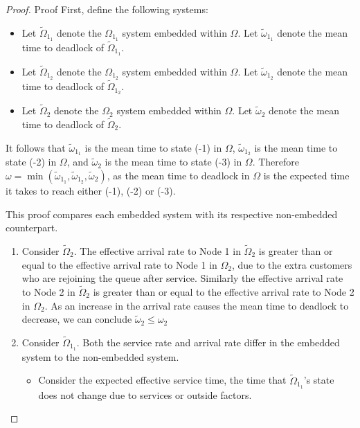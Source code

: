 \documentclass{article}
\numberwithin{equation}{section}
\begin{document}
\begin{proof}{Proof}
First, define the following systems:
\begin{itemize}
  \item Let $\widetilde{\Omega}_{1_1}$ denote the $\Omega_{1_1}$ system
  embedded within $\Omega$. Let $\widetilde{\omega}_{1_1}$ denote the mean
  time to deadlock of $\widetilde{\Omega}_{1_1}$.
  \item Let $\widetilde{\Omega}_{1_2}$ denote the $\Omega_{1_2}$ system
  embedded within $\Omega$. Let $\widetilde{\omega}_{1_2}$ denote the mean
  time to deadlock of $\widetilde{\Omega}_{1_2}$.
  \item Let $\widetilde{\Omega}_2$ denote the $\Omega_2$ system embedded
  within $\Omega$. Let $\widetilde{\omega}_2$ denote the mean time to deadlock
  of $\widetilde{\Omega}_2$.
\end{itemize}

It follows that $\widetilde{\omega}_{1_1}$ is the mean time to state (-1) in
$\Omega$, $\widetilde{\omega}_{1_2}$ is the mean time to state (-2) in
$\Omega$, and $\widetilde{\omega}_2$ is the mean time to state (-3) in
$\Omega$.
Therefore $\omega = \min(\widetilde{\omega}_{1_1}, \widetilde{\omega}_{1_2},
\widetilde{\omega}_2)$, as the mean time to deadlock in $\Omega$ is the
expected time it takes to reach either (-1), (-2) or (-3).

This proof compares each embedded system with its respective non-embedded
counterpart.

\begin{enumerate}

\item Consider $\widetilde{\Omega}_2$.
The effective arrival rate to Node 1 in $\widetilde{\Omega}_2$ is greater than
or equal to the effective arrival rate to Node 1 in $\Omega_2$, due to the
extra customers who are rejoining the queue after service.
Similarly the effective arrival rate to Node 2 in $\widetilde{\Omega}_2$ is
greater than or equal to the effective arrival rate to Node 2 in $\Omega_2$.
As an increase in the arrival rate causes the mean time to deadlock to
decrease, we can conclude $\widetilde{\omega}_2 \leq \omega_2$

\item Consider $\widetilde{\Omega}_{1_1}$. Both the service rate and arrival
rate differ in the embedded system to the non-embedded system.

\begin{itemize}

\item Consider the expected effective service time, the time that
$\widetilde{\Omega}_{1_1}$'s state does not change due to services or outside
factors.


\end{itemize}
\end{enumerate}
\end{proof}
\end{document}
